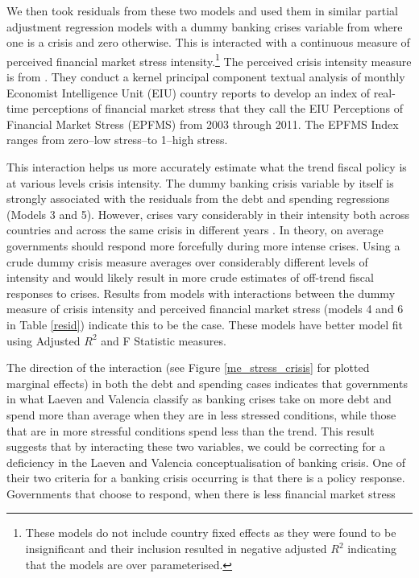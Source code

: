 \documentclass[]{article}
\begin{document}
We then took residuals from these two models and used them in similar partial adjustment regression models with a dummy banking crises variable from \cite{laeven2013} where one is a crisis and zero otherwise. This is interacted with a continuous measure of perceived financial market stress intensity.\footnote{These models do not include country fixed effects as they were found to be insignificant and their inclusion resulted in negative adjusted $R^{2}$ indicating that the models are over parameterised.} The perceived crisis intensity measure is from \cite{gandrudHallEPFMS}. They conduct a kernel principal component textual analysis \citep{Spirling2012} of monthly Economist Intelligence Unit (EIU) country reports to develop an index of real-time perceptions of financial market stress that they call the EIU Perceptions of Financial Market Stress (EPFMS) from 2003 through 2011. The EPFMS Index ranges from zero--low stress--to 1--high stress.

This interaction helps us more accurately estimate what the trend fiscal policy is at various levels crisis intensity. The dummy banking crisis variable by itself is strongly associated with the residuals from the debt and spending regressions (Models 3 and 5). However, crises vary considerably in their intensity both across countries and across the same crisis in different years \cite{gandrudHallEPFMS}. In theory, on average governments should respond more forcefully during more intense crises. Using a crude dummy crisis measure averages over considerably different levels of intensity and would likely result in more crude estimates of off-trend fiscal responses to crises. Results from models with interactions between the dummy measure of crisis intensity and perceived financial market stress (models 4 and 6 in Table \ref{resid}) indicate this to be the case. These models have better model fit using Adjusted $R^{2}$ and F Statistic measures.

The direction of the interaction (see Figure \ref{me_stress_crisis} for plotted marginal effects) in both the debt and spending cases indicates that governments in what Laeven and Valencia classify as banking crises take on more debt and spend more than average when they are in less stressed conditions, while those that are in more stressful conditions spend less than the trend. This result suggests that by interacting these two variables, we could be correcting for a deficiency in the Laeven and Valencia conceptualisation of banking crisis. One of their two criteria for a banking crisis occurring is that there is a policy response. Governments that choose to respond, when there is less financial market stress
\end{document}
